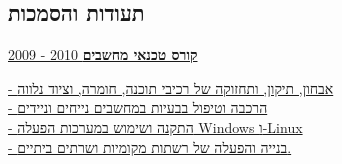 \documentclass[
	11pt,a4paper %
]{article}
\newcommand{\jobentry}[5]{
	{\raggedleft\textsc{#1\expandafter\ifstrequal\expandafter{#2}{}{}{\hspace{6pt}\footnotesize{(#2)}}}\par} %
	\expandafter\ifstrequal\expandafter{#3}{}{}{{\raggedright\large #3}\\} %
	\expandafter\ifstrequal\expandafter{#4}{}{}{{\raggedright\large\textit{\textbf{#4}}}\\[4pt]} %
	\expandafter\ifstrequal\expandafter{#5}{}{}{#5} %
	\medskip %
}
\newcommand{\tableentry}[3]{
	\textsc{#1} & #2\expandafter\ifstrequal\expandafter{#3}{}{\\}{\\[5pt]} %
}
\begin{document}
\begin{hebrew}
\begin{paracol}{2}



\section{תעודות והסמכות}

\href{https://loona-il.000webhostapp.com/resume-references/computer-technitian-certificate.jpg}{\textbf{קורס טכנאי מחשבים}
	\hfill
	2010 - 2009}

\href{https://loona-il.000webhostapp.com/resume-references/computer-technitian-certificate.jpg}{
- אבחון, תיקון, ותחזוקה של רכיבי תוכנה, חומרה, וציוד נלווה \\
- הרכבה וטיפול בבעיות במחשבים נייחים וניידים \\
- התקנה ושימוש במערכות הפעלה Windows ו-Linux \\
- בנייה והפעלה של רשתות מקומיות ושרתים ביתיים.}
%







\end{paracol}
\end{hebrew}
\end{document}
